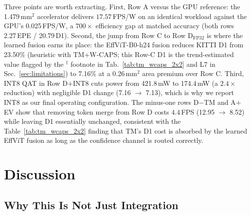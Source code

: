 \documentclass[journal]{IEEEtran}
\begin{document}
Three points are worth extracting. First, Row A versus the GPU reference: the 1.479\,mm$^2$ accelerator delivers $17.57$\,FPS/W on an identical workload against the GPU's 0.025\,FPS/W, a $700\times$ efficiency gap at matched accuracy (both rows 2.27\,EPE / 20.79\,D1). Second, the jump from Row C to Row D$_{\mathrm{FP32}}$ is where the learned fusion earns its place: the EffViT-B0-h24 fusion reduces KITTI D1 from 23.50\% (heuristic with TM+W-CAPS; this Row-C D1 is the trend-estimated value flagged by the $^\ddagger$ footnote in Tab.~\ref{tab:tm_wcaps_2x2} and L7 in Sec.~\ref{sec:limitations}) to 7.16\% at a 0.26\,mm$^2$ area premium over Row C. Third, INT8 QAT in Row D$+$INT8 cuts power from 421.8\,mW to 174.4\,mW (a $2.4\times$ reduction) with negligible D1 change (7.16 $\to$ 7.13), which is why we report INT8 as our final operating configuration. The minus-one rows D$-$TM and A$+$EV show that removing token merge from Row D costs $4.4$\,FPS (12.95 $\to$ 8.52) while leaving D1 essentially unchanged, consistent with the Table~\ref{tab:tm_wcaps_2x2} finding that TM's D1 cost is absorbed by the learned EffViT fusion as long as the confidence channel is routed correctly.

\section{Discussion}
\label{sec:discussion}

\subsection{Why This Is Not Just Integration}
\label{sec:not_integration}
\end{document}
